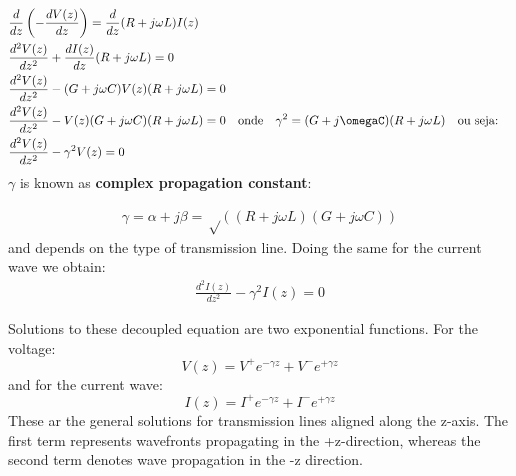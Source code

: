 \documentclass{article}
\begin{document}
\begin{align*}
  &\frac{d}{dz}\left(-\frac{dV(z)}{dz}\right)=\frac{d}{dz}(R+j\omega L)I(z)\\
  &\frac{d^2V(z)}{dz^2}+\frac{dI(z)}{dz}(R+j\omega L)=0\\
  &\frac{d^2V(z)}{dz^2}-(G+j\omega C)V(z)(R+j\omega L)=0\\
  &\frac{d^2V(z)}{dz^2}-V(z)(G+j\omega C)(R+j\omega L)=0 \quad \text{onde} \quad \gamma^2=(G+j\omegaC)(R+j\omega L) \quad \text{ou seja:} \quad \\
  &\frac{d^2V(z)}{dz^2}-\gamma^2V(z)=0
\end{align*}
\(\gamma\) is known as \textbf{complex propagation constant}:

\begin{align*}
  \gamma=\alpha+j\beta=\sqrt\left((R+j\omega L)(G+j\omega C)\right)
\end{align*}
and depends on the type of transmission line.
Doing the same for the current wave we obtain:
\begin{align}
  \frac{d^2I(z)}{dz^2}-\gamma^2I(z)=0
\end{align}

Solutions to these decoupled equation are two exponential functions. For the voltage:
\begin{equation}
    V(z)=V^+ e^{-\gamma z} + V^- e^{+\gamma z}
  \label{eq:VoltageWaveSolution}
\end{equation}
and for the current wave:
\begin{equation}
    I(z)=I^+ e^{-\gamma z} + I^- e^{+\gamma z}
  \label{eq:CurrentWaveSolution}
\end{equation}
These ar the general solutions for transmission lines aligned along the z-axis. The first term represents wavefronts propagating in the +z-direction, whereas the second term denotes wave propagation in the -z direction.
\end{document}
